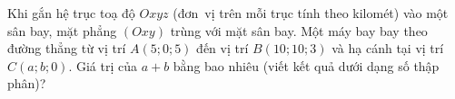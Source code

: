 \begin{bt}%
	Khi gắn hệ trục toạ độ $Oxyz$ (đơn~vị trên mỗi trục tính theo kilomét) vào  một sân bay, mặt phẳng $(Oxy)$ trùng với mặt sân bay. Một máy bay bay theo đường thẳng từ vị trí $A\left(5;0;5\right)$ đến vị trí $B\left(10;10;3\right)$ và hạ cánh tại vị trí $C\left(a;b;0\right)$. Giá trị của $a+b$ bằng bao nhiêu (viết kết quả dưới dạng số thập phân)?
\end{bt}

